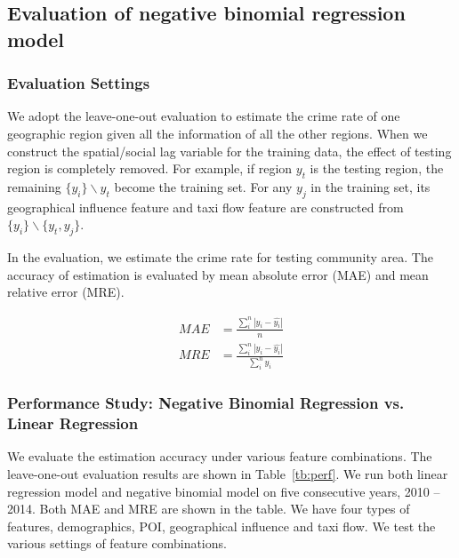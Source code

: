 \subsection{Evaluation of negative binomial regression model}



\subsubsection{Evaluation Settings}

We adopt the leave-one-out evaluation to estimate the crime rate of one geographic region given all the information of all the other regions. When we construct the spatial/social lag variable for the training data, the effect of testing region is completely removed. For example, if region $y_t$ is the testing region, the remaining $\{y_i\} \backslash y_t$ become the training set. For any $y_j$ in the training set, its geographical influence feature and taxi flow feature are constructed from $\{y_i\} \backslash \{y_t, y_j\}$.


In the evaluation, we estimate the crime rate for testing community area. The accuracy of estimation is evaluated by mean absolute error (MAE) and mean relative error (MRE).

\begin{align}
MAE & = \frac{\sum_i^n |y_i - \hat{y_i}| }{n} \\
MRE & = \frac{\sum_i^n |y_i - \hat{y_i}|} {\sum_i^n y_i }
\end{align}


\subsubsection{Performance Study: Negative Binomial Regression vs. Linear Regression}


We evaluate the estimation accuracy under various feature combinations. The leave-one-out evaluation results are shown in Table~\ref{tb:perf}.  We run both linear regression model and negative binomial model on five consecutive years, 2010 -- 2014. Both MAE and MRE are shown in the table. We have four types of features, demographics, POI, geographical influence and taxi flow. We test the various settings of feature combinations.





